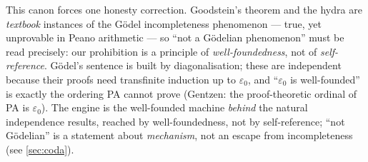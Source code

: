 \begin{remark}
This canon forces one honesty correction. Goodstein's theorem and the hydra are \emph{textbook}
instances of the G\"odel incompleteness phenomenon --- true, yet unprovable in Peano arithmetic --- so
``not a G\"odelian phenomenon'' must be read precisely: our prohibition is a principle of
\emph{well-foundedness}, not of \emph{self-reference}. G\"odel's sentence is built by diagonalisation;
these are independent because their proofs need transfinite induction up to $\varepsilon_0$, and
``$\varepsilon_0$ is well-founded'' is exactly the ordering PA cannot prove (Gentzen: the
proof-theoretic ordinal of PA is $\varepsilon_0$). The engine is the well-founded machine \emph{behind}
the natural independence results, reached by well-foundedness, not by self-reference; ``not
G\"odelian'' is a statement about \emph{mechanism}, not an escape from incompleteness (see
\cref{sec:coda}).
\end{remark}
